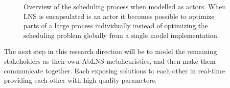 \begin{figure}[H]
	\centering
	
	\caption{
		Overview of the scheduling process when modelled as actors. When LNS is encapsulated 
		is an actor it becomes possible to optimize parts of a large process individually instead of 
		optimizing the scheduling problem globally from a single model implementation.
	}
	\label{fig:ordinator-architecture}
\end{figure}

The next step in this research direction will be to model the remaining stakeholders as their own 
AbLNS metaheuristics, and then make them communicate together. Each exposing solutions to each 
other in real-time providing each other with high quality parameters.
